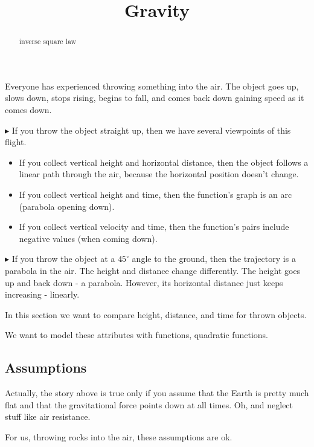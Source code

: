 \documentclass{ximera}
\title{Gravity}
\begin{document}
\begin{abstract}
inverse square law
\end{abstract}
\maketitle


Everyone has experienced throwing something into the air. The object goes up, slows down, stops rising, begins to fall, and comes back down gaining speed as it comes down.  





$\blacktriangleright$ If you throw the object straight up, then we have several viewpoints of this flight. 

\begin{itemize}
\item If you collect vertical height and horizontal distance, then the object follows a linear path through the air, because the horizontal position doesn't change.  
\item If you collect vertical height and time, then the function's graph is an arc (parabola opening down).
\item If you collect vertical velocity and time, then the function's pairs include negative values (when coming down).
\end{itemize}




$\blacktriangleright$  If you throw the object at a $45^{\circ}$ angle to the ground, then the trajectory is a parabola in the air.  The height and distance change differently.  The height goes up and back down - a parabola.  However, its horizontal distance just keeps increasing - linearly. 


In this section we want to compare height, distance, and time for thrown objects. 

We want to model these attributes with functions, quadratic functions.



\subsection*{Assumptions}

Actually, the story above is true only if you assume that the Earth is pretty much flat and that the gravitational force points down at all times. Oh, and neglect stuff like air resistance.


For us, throwing rocks into the air, these assumptions are ok.
\end{document}
